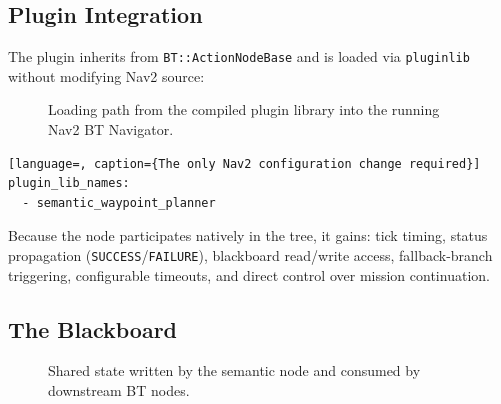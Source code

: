 \documentclass[11pt,a4paper]{article}
\begin{document}
\subsection{Plugin Integration}

The plugin inherits from \texttt{BT::ActionNodeBase} and is loaded via
\texttt{pluginlib} without modifying Nav2 source:

\begin{figure}[h]
\centering
{}
\caption{Loading path from the compiled plugin library into the running Nav2 BT Navigator.}
\end{figure}

\begin{lstlisting}[language=, caption={The only Nav2 configuration change required}]
plugin_lib_names:
  - semantic_waypoint_planner
\end{lstlisting}

Because the node participates natively in the tree, it gains: tick timing,
status propagation (\texttt{SUCCESS}/\texttt{FAILURE}), blackboard read/write
access, fallback-branch triggering, configurable timeouts, and direct control
over mission continuation.

\subsection{The Blackboard}

\begin{figure}[h]
\centering
{}
\caption{Shared state written by the semantic node and consumed by downstream BT nodes.}
\end{figure}
\end{document}
